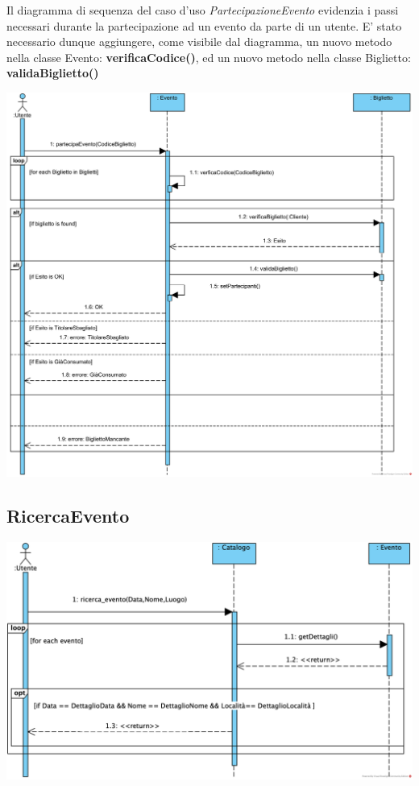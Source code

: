 \begin{center}
Il diagramma di sequenza del caso d’uso \textit{PartecipazioneEvento} evidenzia i passi necessari durante la partecipazione ad un evento da parte di un utente. E' stato necessario dunque aggiungere, come visibile dal diagramma, un nuovo metodo nella classe Evento: \textbf{verificaCodice()}, ed un nuovo metodo nella classe Biglietto: \textbf{validaBiglietto()}

\vspace{1ex}
\includegraphics[height=0.38\textheight]{assets/casid'uso/PartecipazioneEvento.png}
\vspace{1ex}
\end{center}
\subsection{RicercaEvento}
\begin{center}
\includegraphics[height=0.38\textheight]{assets/casid'uso/RicercaEvento.png}
\vspace{1ex}
\end{center}

